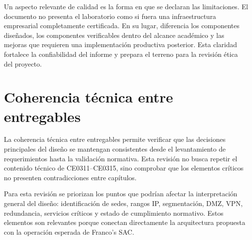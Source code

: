 \documentclass[11pt, a4paper, oneside]{report}
\begin{document}
Un aspecto relevante de calidad es la forma en que se declaran las limitaciones. El documento no presenta el laboratorio como si fuera una infraestructura empresarial completamente certificada. En su lugar, diferencia los componentes diseñados, los componentes verificables dentro del alcance académico y las mejoras que requieren una implementación productiva posterior. Esta claridad fortalece la confiabilidad del informe y prepara el terreno para la revisión ética del proyecto.

\section{Coherencia técnica entre entregables}

La coherencia técnica entre entregables permite verificar que las decisiones principales del diseño se mantengan consistentes desde el levantamiento de requerimientos hasta la validación normativa. Esta revisión no busca repetir el contenido técnico de CE0311--CE0315, sino comprobar que los elementos críticos no presenten contradicciones entre capítulos.

Para esta revisión se priorizan los puntos que podrían afectar la interpretación general del diseño: identificación de sedes, rangos IP, segmentación, DMZ, VPN, redundancia, servicios críticos y estado de cumplimiento normativo. Estos elementos son relevantes porque conectan directamente la arquitectura propuesta con la operación esperada de Franco's SAC.

\renewcommand{\arraystretch}{1.3}
\footnotesize
{}
\end{document}
